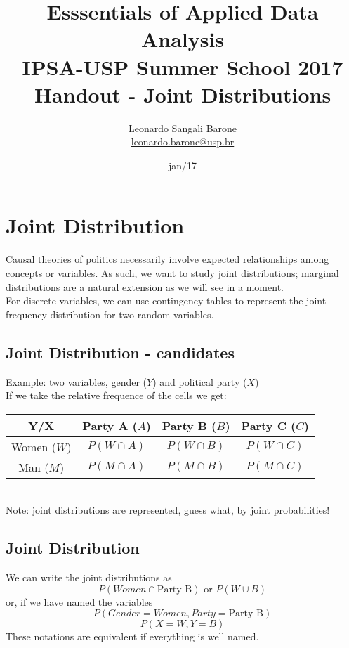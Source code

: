 \documentclass[11pt]{article}
\title{\textbf{Esssentials of Applied Data Analysis\\
				IPSA-USP Summer School 2017}\newline\\
				Handout - Joint Distributions}
\author{Leonardo Sangali Barone\\ \href{leonardo.barone@usp.br}{leonardo.barone@usp.br}}
\date{jan/17}
\begin{document}
\maketitle


\section*{Joint Distribution}

	Causal theories of politics necessarily involve expected relationships among concepts or variables. As such, we want to study joint distributions; marginal distributions are a natural extension as we will see in a moment.
	\newline\\
	For discrete variables, we can use contingency tables to represent the joint frequency distribution for two random variables.


	\subsection*{Joint Distribution - candidates}
	
	Example: two variables, gender ($Y$) and political party ($X$)\\
	If we take the relative frequence of the cells we get:\\

	\begin{tabular}{|c|ccc|}
\hline
	Y/X & Party A ($A$) & Party B ($B$) & Party C ($C$)\\
\hline
	Women ($W$) & $P(W \cap A)$ & $P(W \cap B)$ & $P(W \cap C)$\\
	Man ($M$) & $P(M \cap A)$ & $P(M \cap B)$ & $P(M \cap C)$\\
\hline
\end{tabular}\newline\\
\small{Note: joint distributions are represented, guess what, by joint probabilities!}


	\subsection*{Joint Distribution }
	We can write the joint distributions as \[P(Women \cap \text{Party B}) \text{ or }P(W \cup B)\] or, if we have named the variables \[P(Gender = Women, Party = \text{Party B})\] \[P(X = W, Y = B)\] These notations are equivalent if everything is well named.
\end{document}
